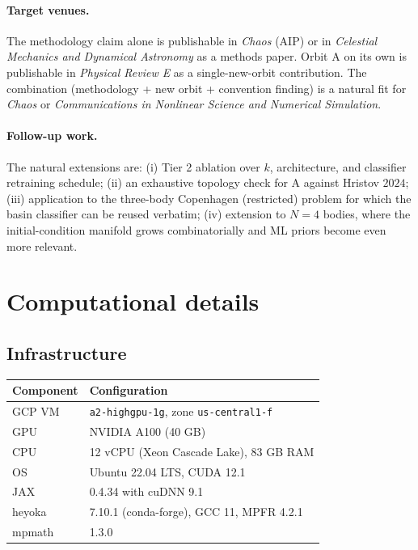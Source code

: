 \documentclass[11pt]{article}
\begin{document}
\paragraph{Target venues.} The methodology claim alone is
publishable in \emph{Chaos} (AIP) or in \emph{Celestial Mechanics and
Dynamical Astronomy} as a methods paper. Orbit A on its own is
publishable in \emph{Physical Review E} as a single-new-orbit
contribution. The combination (methodology + new orbit + convention
finding) is a natural fit for \emph{Chaos} or
\emph{Communications in Nonlinear Science and Numerical Simulation}.

\paragraph{Follow-up work.} The natural extensions are: (i) Tier 2
ablation over $k$, architecture, and classifier retraining schedule;
(ii) an exhaustive topology check for A against Hristov $2024$; (iii)
application to the three-body Copenhagen (restricted) problem for
which the basin classifier can be reused verbatim; (iv) extension to
$N=4$ bodies, where the initial-condition manifold grows
combinatorially and ML priors become even more relevant.

\appendix

\section{Computational details}

\subsection{Infrastructure}

\begin{tabular}{@{}ll@{}}
\toprule
Component & Configuration \\
\midrule
GCP VM & \texttt{a2-highgpu-1g}, zone \texttt{us-central1-f} \\
GPU & NVIDIA A100 (40 GB) \\
CPU & 12 vCPU (Xeon Cascade Lake), 83 GB RAM \\
OS & Ubuntu 22.04 LTS, CUDA 12.1 \\
JAX & 0.4.34 with cuDNN 9.1 \\
heyoka & 7.10.1 (conda-forge), GCC 11, MPFR 4.2.1 \\
mpmath & 1.3.0 \\
\bottomrule
\end{tabular}
\end{document}
